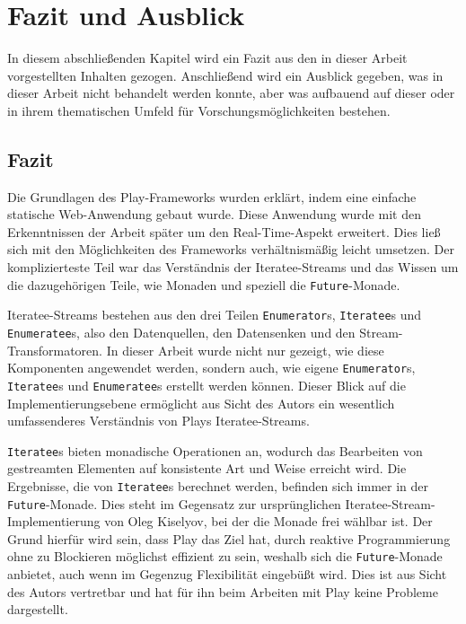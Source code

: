
\chapter{Fazit und Ausblick} %
\label{cha:fazit_und_ausblick}

In diesem abschließenden Kapitel wird ein Fazit aus den in dieser Arbeit vorgestellten Inhalten gezogen.
Anschließend wird ein Ausblick gegeben, was in dieser Arbeit nicht behandelt werden konnte, aber was aufbauend auf dieser oder in ihrem thematischen Umfeld für Vorschungsmöglichkeiten bestehen.

\section{Fazit} %
\label{sec:fazit}

Die Grundlagen des Play-Frameworks wurden erklärt, indem eine einfache statische Web-Anwendung gebaut wurde.
Diese Anwendung wurde mit den Erkenntnissen der Arbeit später um den Real-Time-Aspekt erweitert.
Dies ließ sich mit den Möglichkeiten des Frameworks verhältnismäßig leicht umsetzen.
Der komplizierteste Teil war das Verständnis der Iteratee-Streams und das Wissen um die dazugehörigen Teile, wie Monaden und speziell die \lstinline|Future|-Monade.

Iteratee-Streams bestehen aus den drei Teilen \lstinline|Enumerator|s, \lstinline|Iteratee|s und \lstinline|Enumeratee|s, also den Datenquellen, den Datensenken und den Stream-Transformatoren.
In dieser Arbeit wurde nicht nur gezeigt, wie diese Komponenten angewendet werden, sondern auch, wie eigene \lstinline|Enumerator|s, \lstinline|Iteratee|s und \lstinline|Enumeratee|s erstellt werden können.
Dieser Blick auf die Implementierungsebene ermöglicht aus Sicht des Autors ein wesentlich umfassenderes Verständnis von Plays Iteratee-Streams.

\lstinline|Iteratee|s bieten monadische Operationen an, wodurch das Bearbeiten von gestreamten Elementen auf konsistente Art und Weise erreicht wird.
Die Ergebnisse, die von \lstinline|Iteratee|s berechnet werden, befinden sich immer in der \lstinline|Future|-Monade.
Dies steht im Gegensatz zur ursprünglichen Iteratee-Stream-Implementierung von Oleg Kiselyov, bei der die Monade frei wählbar ist.
Der Grund hierfür wird sein, dass Play das Ziel hat, durch reaktive Programmierung ohne zu Blockieren möglichst effizient zu sein, weshalb sich die \lstinline|Future|-Monade anbietet, auch wenn im Gegenzug Flexibilität eingebüßt wird.
Dies ist aus Sicht des Autors vertretbar und hat für ihn beim Arbeiten mit Play keine Probleme dargestellt.

